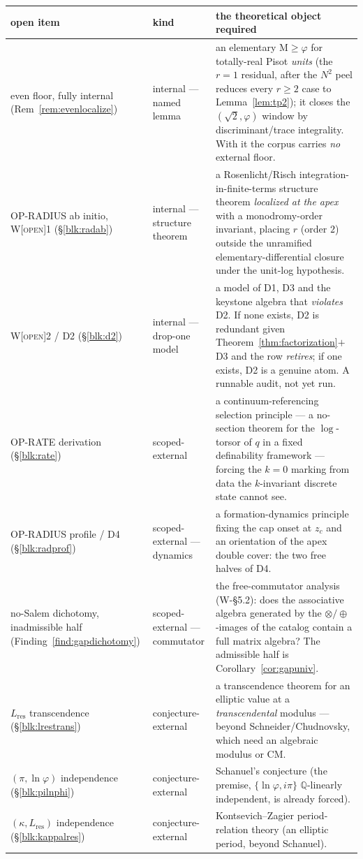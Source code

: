 \documentclass[11pt]{article}
\newcommand{\tagO}{\textcolor{cO}{\textsc{[open]}}}
\newcommand{\Q}{\mathbb{Q}}
\newcommand{\gp}{\varphi}
\newcommand{\M}{\mathrm{M}}
\theoremstyle{plain}
\theoremstyle{definition}
\theoremstyle{remark}
\begin{document}
\begin{center}\footnotesize\setlength{\tabcolsep}{4pt}
\begin{tabular}{@{}p{3.5cm}p{1.9cm}p{8.3cm}@{}}
\toprule
open item & kind & the theoretical object required\\
\midrule
even floor, fully internal (Rem~\ref{rem:evenlocalize}) & internal --- named lemma & an elementary $\M\ge\gp$ for totally-real Pisot \emph{units} (the $r=1$ residual, after the $N^2$ peel reduces every $r\ge2$ case to Lemma~\ref{lem:tp2}); it closes the $(\sqrt2,\gp)$ window by discriminant/trace integrality. With it the corpus carries \emph{no} external floor.\\[2pt]
OP-RADIUS ab initio, W\tagO{}1 (\S\ref{blk:radab}) & internal --- structure theorem & a Rosenlicht/Risch integration-in-finite-terms structure theorem \emph{localized at the apex} with a monodromy-order invariant, placing $r$ (order $2$) outside the unramified elementary-differential closure under the unit-log hypothesis.\\[2pt]
W\tagO{}2 / D2 (\S\ref{blk:d2}) & internal --- drop-one model & a model of D1, D3 and the keystone algebra that \emph{violates} D2. If none exists, D2 is redundant given Theorem~\ref{thm:factorization}$+$D3 and the row \emph{retires}; if one exists, D2 is a genuine atom. A runnable audit, not yet run.\\[2pt]
OP-RATE derivation (\S\ref{blk:rate}) & scoped-external & a continuum-referencing selection principle --- a no-section theorem for the $\log$-torsor of $q$ in a fixed definability framework --- forcing the $k=0$ marking from data the $k$-invariant discrete state cannot see.\\[2pt]
OP-RADIUS profile / D4 (\S\ref{blk:radprof}) & scoped-external --- dynamics & a formation-dynamics principle fixing the cap onset at $z_c$ and an orientation of the apex double cover: the two free halves of D4.\\[2pt]
no-Salem dichotomy, inadmissible half (Finding~\ref{find:gapdichotomy}) & scoped-external --- commutator & the free-commutator analysis (W-\S5.2): does the associative algebra generated by the $\otimes/\oplus$-images of the catalog contain a full matrix algebra? The admissible half is Corollary~\ref{cor:gapuniv}.\\[2pt]
$L_{\mathrm{res}}$ transcendence (\S\ref{blk:lrestrans}) & conjecture-external & a transcendence theorem for an elliptic value at a \emph{transcendental} modulus --- beyond Schneider/Chudnovsky, which need an algebraic modulus or CM.\\[2pt]
$(\pi,\ln\gp)$ independence (\S\ref{blk:pilnphi}) & conjecture-external & Schanuel's conjecture (the premise, $\{\ln\gp,i\pi\}$ $\Q$-linearly independent, is already forced).\\[2pt]
$(\kappa,L_{\mathrm{res}})$ independence (\S\ref{blk:kappalres}) & conjecture-external & Kontsevich--Zagier period-relation theory (an elliptic period, beyond Schanuel).\\
\bottomrule
\end{tabular}
\end{center}
\end{document}
